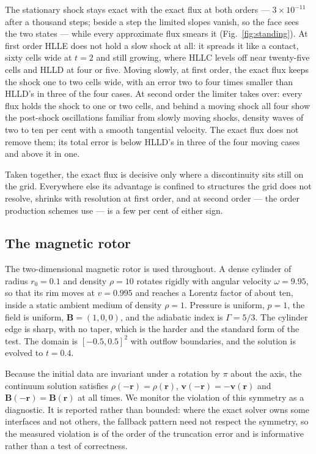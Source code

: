The stationary shock stays exact with the exact flux at both orders ---
$3\times10^{-11}$ after a thousand steps; beside a step the limited slopes
vanish, so the face sees the two states --- while every approximate flux
smears it (Fig.~\ref{fig:standing}). At first order HLLE does not hold a slow
shock at all: it spreads it like a contact, sixty cells wide at $t = 2$ and
still growing, where HLLC levels off near twenty-five cells and HLLD at four
or five. Moving slowly, at first order, the exact flux keeps the shock one to
two cells wide, with an error two to four times smaller than HLLD's in three
of the four cases. At second order the limiter takes over: every flux holds
the shock to one or two cells, and behind a moving shock all four show the
post-shock oscillations familiar from slowly moving shocks, density waves of
two to ten per cent with a smooth tangential velocity. The exact flux does not
remove them; its total error is below HLLD's in three of the four moving
cases and above it in one.

Taken together, the exact flux is decisive only where a discontinuity sits
still on the grid. Everywhere else its advantage is confined to structures
the grid does not resolve, shrinks with resolution at first order, and at
second order --- the order production schemes use --- is a few per cent
of either sign.

\subsection{The magnetic rotor}
\label{sec:tests:rotor}
\label{sec:setup:rotor}

The two-dimensional magnetic rotor is used throughout. A dense cylinder of
radius $r_0 = 0.1$ and density $\rho = 10$ rotates rigidly with angular
velocity $\omega = 9.95$, so that its rim moves at $v = 0.995$ and reaches a
Lorentz factor of about ten, inside a static ambient medium of density
$\rho = 1$. Pressure is uniform, $p = 1$, the field is uniform,
$\mathbf{B} = (1, 0, 0)$, and the adiabatic index is $\Gamma = 5/3$. The
cylinder edge is sharp, with no taper, which is the harder and the standard
form of the test. The domain is $[-0.5, 0.5]^2$ with outflow boundaries, and
the solution is evolved to $t = 0.4$.

Because the initial data are invariant under a rotation by $\pi$ about the
axis, the continuum solution satisfies
$\rho(-\mathbf{r}) = \rho(\mathbf{r})$,
$\mathbf{v}(-\mathbf{r}) = -\mathbf{v}(\mathbf{r})$ and
$\mathbf{B}(-\mathbf{r}) = \mathbf{B}(\mathbf{r})$ at all times. We monitor
the violation of this symmetry as a diagnostic. It is reported rather than
bounded: where the exact solver owns some interfaces and not others, the
fallback pattern need not respect the symmetry, so the measured violation is
of the order of the truncation error and is informative rather than a test of
correctness.
